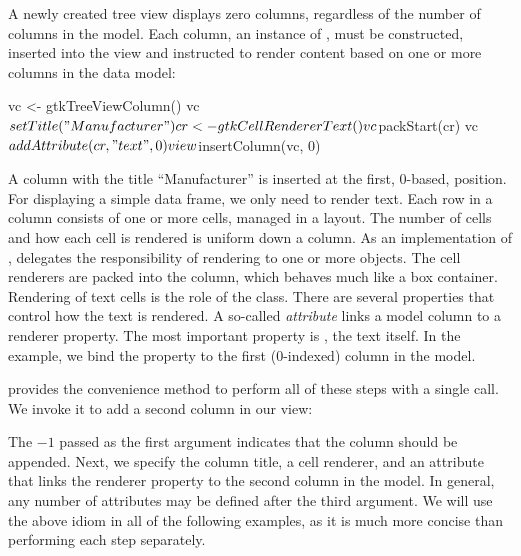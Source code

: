A newly created tree view displays zero columns, regardless of the
number of columns in the model. Each column, an instance of
, must be constructed, inserted into the view and
instructed to render content based on one or more columns in the data
model:
\begin{Schunk}
\begin{Sinput}
 vc <- gtkTreeViewColumn()
 vc$setTitle("Manufacturer")
 cr <- gtkCellRendererText()
 vc$packStart(cr)
 vc$addAttribute(cr, "text", 0)
 view$insertColumn(vc, 0)
\end{Sinput}
\end{Schunk}
%
A column with the title ``Manufacturer'' is inserted at the first,
$0$-based, position. For displaying a simple data frame, we only need
to render text. Each row in a column consists of one or more cells,
managed in a layout. The number of cells and how each cell is rendered
is uniform down a column. As an implementation of
,  delegates the
responsibility of rendering to one or more 
objects. The cell renderers are packed into the column, which behaves
much like a box container. Rendering of text cells is the role of the
 class. There are several properties that
control how the text is rendered. A so-called \textit{attribute} links
a model column to a renderer property. The most important property is
, the text itself. In the example, we bind the 
property to the first ($0$-indexed) column in the model.

 provides the
 convenience method to
perform all of these steps with a single call. We invoke it to add a
second column in our view:
\begin{Schunk}
\end{Schunk}
% 
The $-1$ passed as the first argument indicates that the column should
be appended. Next, we specify the column title, a cell renderer, and
an attribute that links the  renderer property to the
second column in the model. In general, any number of attributes may
be defined after the third argument.  We will use the above idiom in
all of the following examples, as it is much more concise than
performing each step separately.

